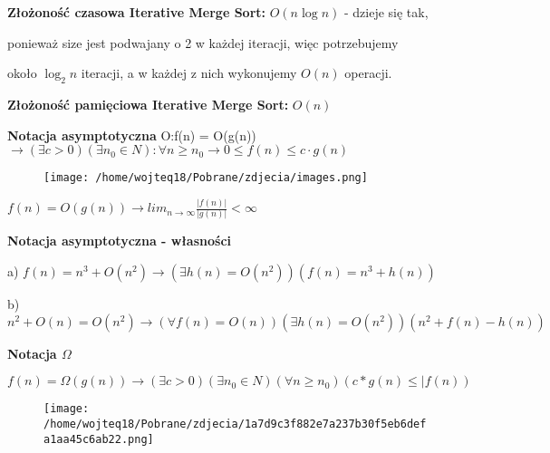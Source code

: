 \documentclass{article}
\begin{document}
\vspace{1\baselineskip}
\textbf{Złożoność czasowa Iterative Merge Sort:} $O(n \log n)$ - dzieje się tak, \par
ponieważ size jest podwajany o 2 w każdej iteracji, więc potrzebujemy \par
około $ \log_2 n$ iteracji, a w każdej z nich wykonujemy $O(n)$ operacji. \par
\vspace{1\baselineskip}
\textbf{Złożoność pamięciowa Iterative Merge Sort:} $O(n)$ \par
\vspace{1\baselineskip}
\textbf{Notacja asymptotyczna}
O:f(n) = O(g(n)) $\rightarrow (\exists c > 0) (\exists n_0 \in N) : \forall n \geq n_0 \rightarrow 0 \leq f(n) \leq c \cdot g(n)$ \par
\vspace{1\baselineskip}
\begin{figure}[H]
    \centering
    \texttt{[image: /home/wojteq18/Pobrane/zdjecia/images.png]}
    \label{fig:example_image}
\end{figure}
\vspace{1\baselineskip}
$f(n) = O(g(n)) \rightarrow lim_{n \to \infty} \frac{|f(n)|}{|g(n)|} < \infty$ \par
\vspace{1\baselineskip}
\textbf{Notacja asymptotyczna - własności} \par
\vspace{1\baselineskip}
a) $f(n) = n^3 + O(n^2) \rightarrow (\exists h(n) = O(n^2))(f(n) = n^3 + h(n))$ \par
\vspace{1\baselineskip}
b) $n^2 + O(n) = O(n^2) \rightarrow (\forall f(n) = O(n))(\exists h(n) = O(n^2))(n^2 + f(n)-h(n))$ \par
\vspace{1\baselineskip}
\textbf{Notacja $\Omega$} \par
\vspace{1\baselineskip}
$f(n) = \Omega (g(n)) \rightarrow(\exists c > 0)(\exists n_0 \in N)(\forall n \geq n_0)(c * g(n) \leq |f(n))$ \par
\vspace{1\baselineskip}
\begin{figure}[H]
    \centering
    \texttt{[image: /home/wojteq18/Pobrane/zdjecia/1a7d9c3f882e7a237b30f5eb6defa1aa45c6ab22.png]}
    \label{fig:example_image}
\end{figure}
\vspace{7\baselineskip}
\end{document}
